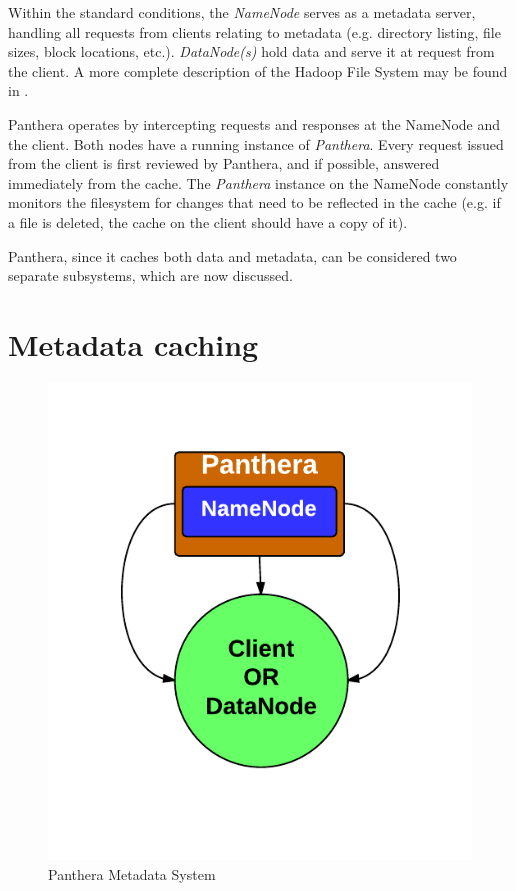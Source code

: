 \documentclass[12pt]{article}
\begin{document}
Within the standard conditions, the \textit{NameNode} serves as a metadata server, handling all requests from clients relating to metadata (e.g. directory listing, file sizes, block locations, etc.). \textit{DataNode(s)} hold data and serve it at request from the client. A more complete description of the Hadoop File System may be found in \cite{hadoop}.

Panthera operates by intercepting requests and responses at the NameNode and the client. Both nodes have a running instance of \textit{Panthera}. Every request issued from the client is first reviewed by Panthera, and if possible, answered immediately from the cache. The \textit{Panthera} instance on the NameNode constantly monitors the filesystem for changes that need to be reflected in the cache (e.g. if a file is deleted, the cache on the client should have a copy of it).

Panthera, since it caches both data and metadata, can be considered two separate subsystems, which are now discussed.

\section{Metadata caching}

\begin{figure}[!h]
	\caption{Panthera Metadata System}
	\centering
		\includegraphics[scale=0.4]{assets/panthera_meta_architecture.pdf}
\end{figure}
\end{document}
